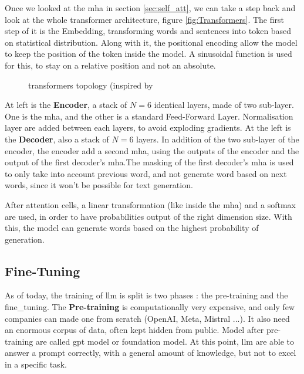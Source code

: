 Once we looked at the \acrshort{mha} in section \ref{sec:self_att}, we can take a step back and look at the whole \gls{transformer} architecture, figure \ref{fig:Transformers}. The first step of it is the Embedding, transforming words and sentences into token based on statistical distribution. Along with it, the positional encoding allow the model to keep the position of the token inside the model. A sinusoidal function is used for this, to stay on a relative position and not an absolute.

\begin{figure}
    \centering
    
    \caption{\Glspl{transformer} topology (inspired by \cite{vaswani_attention_2017}}
    \label{fig:enc_dec}
\end{figure}

At left is the \textbf{Encoder}, a stack of $N=6$  identical layers, made of two sub-layer. One is the \acrshort{mha}, and the other is a standard Feed-Forward Layer. Normalisation layer are added between each layers, to avoid exploding gradients. At the left is the \textbf{Decoder}, also a stack of $N=6$ layers. In addition of the two sub-layer of the encoder, the encoder add a second \acrshort{mha}, using the outputs of the encoder and the output of the first decoder's \acrshort{mha}.The masking of the first decoder's \acrshort{mha} is used to only take into account previous word, and not generate word based on next words, since it won't be possible for text generation.

After attention cells, a linear transformation (like inside the \acrshort{mha}) and a softmax are used, in order to have probabilities output of the right dimension size. With this, the model can generate words based on the highest probability of generation. 


\subsection{Fine-Tuning}
\label{sec:fine_tune}
As of today, the training of \acrshort{llm} is split is two phases : the pre-training and the \gls{fine_tuning}. The \textbf{Pre-training} is computationally very expensive, and only few companies can made one from scratch (OpenAI, Meta, Mistral ...). It also need an enormous corpus of data, often kept hidden from public. Model after pre-training are called \acrfull{gpt} model or foundation model. At this point, \acrshort{llm} are able to answer a prompt correctly, with a general amount of knowledge, but not to excel in a specific task.\\

